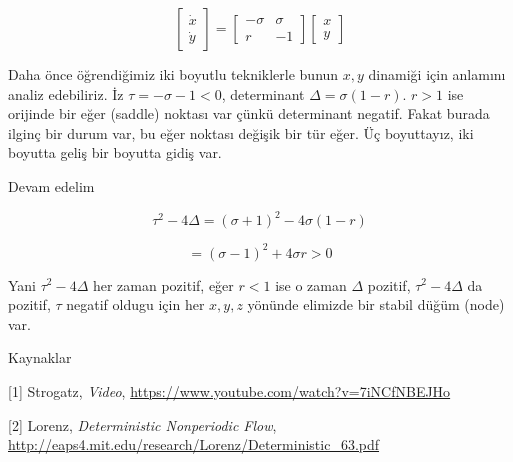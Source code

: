 \documentclass[12pt,fleqn]{article}\usepackage{../../common}
\begin{document}
$$ 
\left[\begin{array}{r} \dot{x} \\ \dot{y} \end{array}\right] =
\left[\begin{array}{rr}
-\sigma & \sigma \\ r & -1 \end{array}\right]
\left[\begin{array}{r} x \\ y \end{array}\right]
$$

Daha önce öğrendiğimiz iki boyutlu tekniklerle bunun $x,y$ dinamiği için
anlamını analiz edebiliriz. İz $\tau = -\sigma - 1 < 0$, determinant
$\Delta = \sigma(1-r)$. $r > 1$ ise orijinde bir eğer (saddle) noktası
var çünkü determinant negatif. Fakat burada ilginç bir durum var, bu eğer
noktası değişik bir tür eğer. Üç boyuttayız, iki boyutta geliş bir boyutta
gidiş var. 

Devam edelim 

$$\tau^2 - 4\Delta = (\sigma+1)^2 - 4\sigma(1-r)$$

$$ = (\sigma-1)^2 + 4\sigma r > 0$$

Yani $\tau^2 - 4\Delta$ her zaman pozitif, eğer $r < 1$ ise o zaman
$\Delta$ pozitif, $\tau^2 - 4\Delta$ da pozitif, $\tau$ negatif oldugu için
her $x,y,z$ yönünde elimizde bir stabil düğüm (node) var.

Kaynaklar

[1] Strogatz, {\em Video}, \url{https://www.youtube.com/watch?v=7iNCfNBEJHo}

[2] Lorenz, {\em Deterministic Nonperiodic Flow}, \url{http://eaps4.mit.edu/research/Lorenz/Deterministic_63.pdf}
\end{document}
